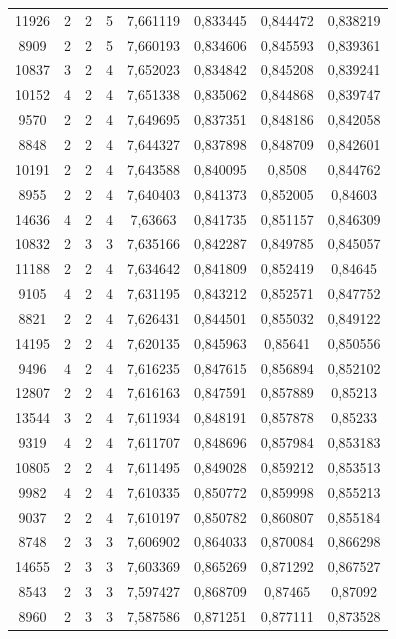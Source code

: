 \begin{longtable}{|c|c|c|c|c|c|c|c|}
11926 & 2 & 2 & 5 & 7,661119 & 0,833445 & 0,844472 & 0,838219 \\
8909 & 2 & 2 & 5 & 7,660193 & 0,834606 & 0,845593 & 0,839361 \\
10837 & 3 & 2 & 4 & 7,652023 & 0,834842 & 0,845208 & 0,839241 \\
10152 & 4 & 2 & 4 & 7,651338 & 0,835062 & 0,844868 & 0,839747 \\
9570 & 2 & 2 & 4 & 7,649695 & 0,837351 & 0,848186 & 0,842058 \\
8848 & 2 & 2 & 4 & 7,644327 & 0,837898 & 0,848709 & 0,842601 \\
10191 & 2 & 2 & 4 & 7,643588 & 0,840095 & 0,8508 & 0,844762 \\
8955 & 2 & 2 & 4 & 7,640403 & 0,841373 & 0,852005 & 0,84603 \\
14636 & 4 & 2 & 4 & 7,63663 & 0,841735 & 0,851157 & 0,846309 \\
10832 & 2 & 3 & 3 & 7,635166 & 0,842287 & 0,849785 & 0,845057 \\
11188 & 2 & 2 & 4 & 7,634642 & 0,841809 & 0,852419 & 0,84645 \\
9105 & 4 & 2 & 4 & 7,631195 & 0,843212 & 0,852571 & 0,847752 \\
8821 & 2 & 2 & 4 & 7,626431 & 0,844501 & 0,855032 & 0,849122 \\
14195 & 2 & 2 & 4 & 7,620135 & 0,845963 & 0,85641 & 0,850556 \\
9496 & 4 & 2 & 4 & 7,616235 & 0,847615 & 0,856894 & 0,852102 \\
12807 & 2 & 2 & 4 & 7,616163 & 0,847591 & 0,857889 & 0,85213 \\
13544 & 3 & 2 & 4 & 7,611934 & 0,848191 & 0,857878 & 0,85233 \\
9319 & 4 & 2 & 4 & 7,611707 & 0,848696 & 0,857984 & 0,853183 \\
10805 & 2 & 2 & 4 & 7,611495 & 0,849028 & 0,859212 & 0,853513 \\
9982 & 4 & 2 & 4 & 7,610335 & 0,850772 & 0,859998 & 0,855213 \\
9037 & 2 & 2 & 4 & 7,610197 & 0,850782 & 0,860807 & 0,855184 \\
8748 & 2 & 3 & 3 & 7,606902 & 0,864033 & 0,870084 & 0,866298 \\
14655 & 2 & 3 & 3 & 7,603369 & 0,865269 & 0,871292 & 0,867527 \\
8543 & 2 & 3 & 3 & 7,597427 & 0,868709 & 0,87465 & 0,87092 \\
8960 & 2 & 3 & 3 & 7,587586 & 0,871251 & 0,877111 & 0,873528 \\

\end{longtable}
